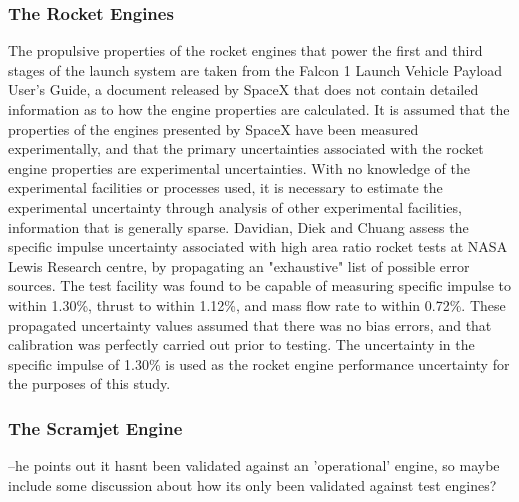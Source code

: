 \subsubsection{The Rocket Engines}
The propulsive properties of the rocket engines that power the first and third stages of the launch system are taken from the Falcon 1 Launch Vehicle Payload User's Guide\cite{Vehicle2008}, a document released by SpaceX that does not contain detailed information as to how the engine properties are calculated. It is assumed that the properties of the engines presented by SpaceX have been measured experimentally, and that the primary uncertainties associated with the rocket engine properties are experimental uncertainties. With no knowledge of the experimental facilities or processes used, it is necessary to estimate the experimental uncertainty through analysis of other experimental facilities, information that is generally sparse. Davidian, Diek and Chuang\cite{Davidian1987} assess the specific impulse uncertainty associated with high area ratio rocket tests at NASA Lewis Research centre, by propagating an "exhaustive" list of possible error sources. The test facility was found to be capable of measuring specific impulse to within 1.30\%, thrust to within 1.12\%, and mass flow rate to within 0.72\%. These propagated uncertainty values assumed that there was no bias errors, and that calibration was perfectly carried out prior to testing. 
The uncertainty in the specific impulse of 1.30\% is used as the rocket engine performance uncertainty for the purposes of this study. 

\subsubsection{The Scramjet Engine}

--he points out it hasnt been validated against an 'operational' engine, so maybe include some discussion about how its only been validated against test engines?



